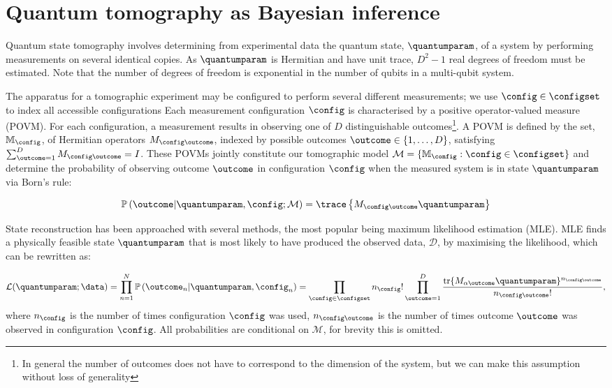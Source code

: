 \section{Quantum tomography as Bayesian inference}

Quantum state tomography involves determining from experimental data the quantum state, $\quantumparam$, of a system by performing measurements on several identical copies. As $\quantumparam$ is Hermitian and have unit trace, $D^2-1$ real degrees of freedom must be estimated. Note that the number of degrees of freedom is exponential in the number of qubits in a multi-qubit system.

The apparatus for a tomographic experiment may be configured to perform several different measurements; we use $\config\in\configset$ to index all accessible configurations Each measurement configuration $\config$ is characterised by a positive operator-valued measure (POVM). For each configuration, a measurement results in observing one of $D$ distinguishable outcomes\footnote{In general the number of outcomes does not have to correspond to the dimension of the system, but we can make this assumption without loss of generality }. A POVM is defined by the set, $\mathbb{M}_{\config}$, of Hermitian operators $M_{\config\outcome}$, indexed by possible outcomes $\outcome\in\{1,\ldots,D\}$, satisfying $\sum_{\outcome=1}^{D} M_{\config\outcome} = I$. These POVMs jointly constitute our tomographic model $\mathcal{M}=\{\mathbb{M}_{\config}:\config\in\configset\}$ and determine the probability of observing outcome $\outcome$ in configuration $\config$ when the measured system is in state $\quantumparam$ via Born's rule:

\begin{equation}
	\mathbb{P}\left(\outcome\vert\quantumparam,\config;\mathcal{M}\right) = \trace\left\{M_{\config\outcome}\quantumparam \right\}\label{eqn:quantum_Born}
\end{equation}

State reconstruction has been approached with several methods, the most popular being maximum likelihood estimation (MLE). MLE finds a physically feasible state $\quantumparam$ that is most likely to have produced the observed data, $\mathcal{D}$, by maximising the likelihood, which can be rewritten as:

\begin{equation}
	\label{eqn:quantum_lik}
	\mathcal{L}(\quantumparam;\data)=\prod_{n=1}^{N} \mathbb{P}\left(\outcome_n\vert\quantumparam,\config_n\right) = \prod_{\config \in \configset}n_{\config}!\prod_{\outcome=1}^{D}\frac{\mbox{tr}\{M_{\alpha\outcome}\quantumparam\}^{n_{\config\outcome}}}{n_{\config\outcome}!},
\end{equation}
where $n_{\config}$ is the number of times configuration $\config$ was used, $n_{\config\outcome}$ is the number of times outcome $\outcome$ was observed in configuration $\config$. All probabilities are conditional on $\mathcal{M}$, for brevity this is omitted.

